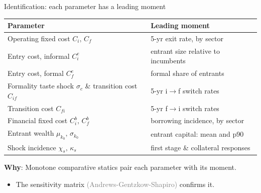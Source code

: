 \documentclass[aspectratio=169]{beamer}
\begin{document}
\begin{frame}{Identification: each parameter has a leading moment}
\begin{center}
\small
\begin{tabular}{ll}
\toprule
\textbf{Parameter} & \textbf{Leading moment} \\
\midrule
Operating fixed cost $C_i,\, C_f$            & 5-yr exit rate, by sector \\
Entry cost, informal $C^e_i$                  & entrant size relative to incumbents \\
Entry cost, formal $C^e_f$                  & formal share of entrants \\
Formality taste shock $\sigma_c$ \& transition cost $C_{if}$ & 5-yr i$\to$f switch rates \\
Transition cost $C_{fi}$ & 5-yr f$\to$i switch rates \\
Financial fixed cost $C^b_i,\, C^b_f$ & borrowing incidence, by sector \\
Entrant wealth $\mu_{k_0},\, \sigma_{k_0}$ & entrant capital: mean and p90  \\
Shock incidence $\chi_s,\, \kappa_s$ & first stage  \& collateral responses \\
\bottomrule
\end{tabular}
\end{center}
\vspace{2mm}
\textbf{Why}: Monotone comparative statics pair each parameter with its moment.

\begin{itemize}
    \item The sensitivity matrix \textcolor{gray}{(Andrews-Gentzkow-Shapiro)} confirms it.
\end{itemize}

\end{frame}

\end{document}
